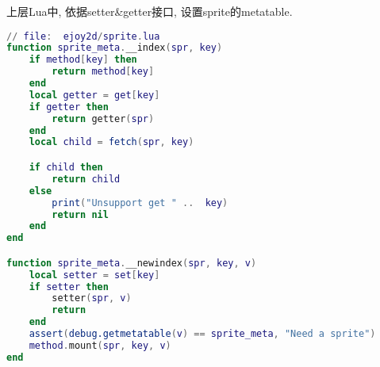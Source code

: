{    {上层Lua中, 依据setter\&getter接口, 设置sprite的metatable. }\par

\begin{lstlisting}[language=lua]
// file:  ejoy2d/sprite.lua
function sprite_meta.__index(spr, key)
    if method[key] then
        return method[key]
    end
    local getter = get[key]
    if getter then
        return getter(spr)
    end
    local child = fetch(spr, key)

    if child then
        return child
    else
        print("Unsupport get " ..  key)
        return nil
    end
end

function sprite_meta.__newindex(spr, key, v)
    local setter = set[key]
    if setter then
        setter(spr, v)
        return
    end
    assert(debug.getmetatable(v) == sprite_meta, "Need a sprite")
    method.mount(spr, key, v)
end
\end{lstlisting}

}

